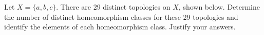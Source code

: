 \begin{comment}

\ExerciseSolution

\ba

\item The indiscrete topology is $\{\emptyset, X\}$ and the discrete topology is $\{\emptyset, \{a\}, \{b\}, X\}$. The only possibilities for a topology that contains $\{a\}$, is the discrete topology or $\tau_a = \{\emptyset, \{a\}, X\}$. Similarly, the remaining topology on $X$ is $\tau_b = \{\emptyset, \{b\}, X\}$. 

\item Since homeomorphisms preserve open sets, and since the indiscrete topology has only two open sets, none of the other topological spaces are homeomorphic to $X$ with the indiscrete topology. Similarly, the discrete topology is the only topology on $X$ with four open sets, so $X$ with the discrete topology forms its own homeomorphism class. 

We will now show that $(X, \tau_a)$ and $(X, \tau_b)$ are in the same homeomorphism class. Let $f : (X, \tau_1) \to (X, \tau_2)$ by $f(a) = b$ and $f(b) = a$. By definition, $f$ is a bijection. Since $f^{-1}(\emptyset) = \emptyset)$, $f^{-1}(\{b\}) - \{a\}$, and $f^{-1}(X) = X$, we conclude that $f$ is a continuous function. The fact that Since $f(\emptyset) = \emptyset)$, $f(\{a\}) - \{b\}$, and $f(X) = X$ means that $f$ is an open function. We conclude that $f$ is a homeomorphism and that $(X, \tau_1)$ and $(X, \tau_2)$ are in the same homeomorphism class. 

To summarize, the homeomorphism classes of topological spaces $X = \{a, b\}$ with two elements are 
\begin{itemize}
\item $X$ with the indiscrete topology,
\item $(X, \{\emptyset, \{a\}, X\})$,
\item $X$ with the discrete topology.
\end{itemize}


\ea


\end{comment}





\item Let $X = \{a,b,c\}$. There are 29 distinct topologies on $X$, shown below. Determine the number of distinct homeomorphism classes for these 29 topologies and identify the elements of each homeomorphism class. Justify your answers. 

